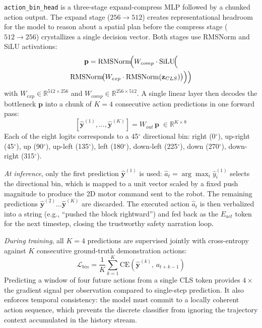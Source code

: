 \documentclass[letterpaper]{article} %
\begin{document}
\texttt{action\_bin\_head} is a three-stage expand-compress MLP followed by a chunked action output. The expand stage ($256 \to 512$) creates representational headroom for the model to reason about a spatial plan before the compress stage ($512 \to 256$) crystallizes a single decision vector. Both stages use RMSNorm \cite{zhang2019rmsnorm} and SiLU activations:
\begin{multline}
\mathbf{p} = \mathrm{RMSNorm}\!\Bigl(W_{comp} \cdot \mathrm{SiLU}\!\Bigl( \\
\mathrm{RMSNorm}\!\bigl(W_{exp} \cdot \mathrm{RMSNorm}(\mathbf{z}_{CLS})\bigr)\Bigr)\Bigr)
\end{multline}
with $W_{exp} \in \mathbb{R}^{512 \times 256}$ and $W_{comp} \in \mathbb{R}^{256 \times 512}$. A single linear layer then decodes the bottleneck $\mathbf{p}$ into a chunk of $K{=}4$ consecutive action predictions in one forward pass:
\begin{equation}
\left[\hat{\mathbf{y}}^{(1)}, \ldots, \hat{\mathbf{y}}^{(K)}\right] = W_{out}\,\mathbf{p} \;\in \mathbb{R}^{K \times 8}
\end{equation}
Each of the eight logits corresponds to a 45$^\circ$ directional bin: right (0$^\circ$), up-right (45$^\circ$), up (90$^\circ$), up-left (135$^\circ$), left (180$^\circ$), down-left (225$^\circ$), down (270$^\circ$), down-right (315$^\circ$).

\textit{At inference}, only the first prediction $\hat{\mathbf{y}}^{(1)}$ is used: $\hat{a}_t = \arg\max_i \hat{y}^{(1)}_i$ selects the directional bin, which is mapped to a unit vector scaled by a fixed push magnitude to produce the 2D motor command sent to the robot. The remaining predictions $\hat{\mathbf{y}}^{(2)}\ldots\hat{\mathbf{y}}^{(K)}$ are discarded. The executed action $\hat{a}_t$ is then verbalized into a string (e.g., ``pushed the block rightward'') and fed back as the $E_{act}$ token for the next timestep, closing the trustworthy safety narration loop.

\textit{During training}, all $K{=}4$ predictions are supervised jointly with cross-entropy against $K$ consecutive ground-truth demonstration actions:
\begin{equation}
\mathcal{L}_{bin} = \frac{1}{K} \sum_{k=1}^{K} \mathrm{CE}\!\left(\hat{\mathbf{y}}^{(k)},\, a_{t+k-1}\right)
\end{equation}
Predicting a window of four future actions from a single CLS token provides $4{\times}$ the gradient signal per observation compared to single-step prediction. It also enforces temporal consistency: the model must commit to a locally coherent action sequence, which prevents the discrete classifier from ignoring the trajectory context accumulated in the history stream.
\end{document}
